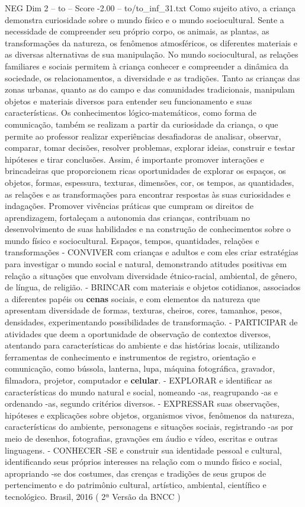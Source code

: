 \begin{textsample}{NEG Dim 2 – to – Score -2.00 – to/to\_inf\_31.txt}
Como sujeito ativo, a criança demonstra curiosidade sobre o mundo físico e o mundo sociocultural.
Sente a necessidade de compreender seu próprio corpo, os animais, as plantas, as transformações da natureza, os fenômenos atmosféricos, os diferentes materiais e as diversas alternativas de sua manipulação.
No mundo sociocultural, as relações familiares e sociais permitem à criança conhecer e compreender a dinâmica da sociedade, os relacionamentos, a diversidade e as tradições.
Tanto as crianças das zonas urbanas, quanto as do campo e das comunidades tradicionais, manipulam objetos e materiais diversos para entender seu funcionamento e suas características.
Os conhecimentos lógico-matemáticos, como forma de comunicação, também se realizam a partir da curiosidade da criança, o que permite ao professor realizar experiências desafiadoras de analisar, observar, comparar, tomar decisões, resolver problemas, explorar ideias, construir e testar hipóteses e tirar conclusões.
Assim, é importante promover interações e brincadeiras que proporcionem ricas oportunidades de explorar os espaços, os objetos, formas, espessura, texturas, dimensões, cor, os tempos, as quantidades, as relações e as transformações para encontrar respostas às suas curiosidades e indagações.
Promover vivências práticas que cumpram os direitos de aprendizagem, fortaleçam a autonomia das crianças, contribuam no desenvolvimento de suas habilidades e na construção de conhecimentos sobre o mundo físico e sociocultural.
Espaços, tempos, quantidades, relações e transformações - CONVIVER com crianças e adultos e com eles criar estratégias para investigar o mundo social e natural, demonstrando atitudes positivas em relação a situações que envolvam diversidade étnico-racial, ambiental, de gênero, de língua, de religião. - BRINCAR com materiais e objetos cotidianos, associados a diferentes papéis ou \textbf{cenas} sociais, e com elementos da natureza que apresentam diversidade de formas, texturas, cheiros, cores, tamanhos, pesos, densidades, experimentando possibilidades de transformação. - PARTICIPAR de atividades que deem a oportunidade de observação de contextos diversos, atentando para características do ambiente e das histórias locais, utilizando ferramentas de conhecimento e instrumentos de registro, orientação e comunicação, como bússola, lanterna, lupa, máquina fotográfica, gravador, filmadora, projetor, computador e \textbf{celular}. - EXPLORAR e identificar as características do mundo natural e social, nomeando -as, reagrupando -as e ordenando -as, segundo critérios diversos. - EXPRESSAR suas observações, hipóteses e explicações sobre objetos, organismos vivos, fenômenos da natureza, características do ambiente, personagens e situações sociais, registrando -as por meio de desenhos, fotografias, gravações em áudio e vídeo, escritas e outras linguagens. - CONHECER -SE e construir sua identidade pessoal e cultural, identificando seus próprios interesses na relação com o mundo físico e social, apropriando -se dos costumes, das crenças e tradições de seus grupos de pertencimento e do patrimônio cultural, artístico, ambiental, científico e tecnológico.
Brasil, 2016 ( 2ª Versão da BNCC )

\end{textsample}
